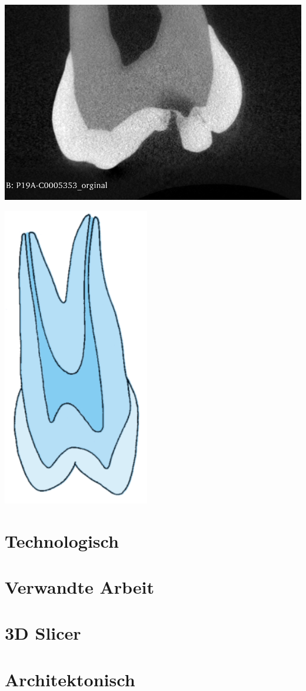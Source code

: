\begin{minipage}{0.45\textwidth}
    \centering
	\includegraphics[scale=0.2]{img/vgl_ct_zeichnung_ct.jpg}
    \label{fig:aufbau_eines_zahnes}
\end{minipage}
\hfill
\begin{minipage}{0.45\textwidth}
	\raggedleft
	\includegraphics[scale=0.65]{img/vgl_ct_zeichnung_zeichnung.jpg}
    \label{fig:aufbau_eines_zahnes}
\end{minipage}



\section{Technologisch}
\label{sec:technologisch}

\section{Verwandte Arbeit}
\label{sec:verwwandte_arbeit}

\section{3D Slicer}
\label{sec:3d_slicer}

\section{Architektonisch}
\label{sec:architektonisch}